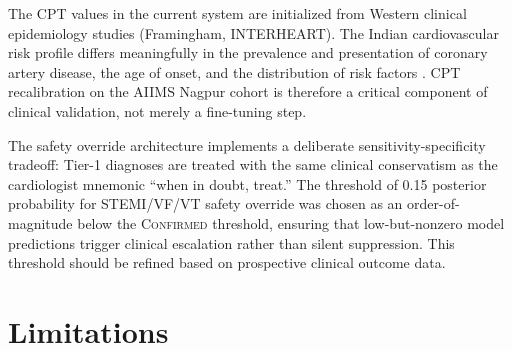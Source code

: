 \documentclass[journal]{IEEEtran}
\begin{document}
The CPT values in the current system are initialized from Western
clinical epidemiology studies (Framingham, INTERHEART).
The Indian cardiovascular risk profile differs meaningfully in
the prevalence and presentation of coronary artery disease,
the age of onset, and the distribution of risk factors
\cite{yusuf2004interheart,gupta2012india}.
CPT recalibration on the AIIMS Nagpur cohort is therefore a
critical component of clinical validation, not merely a fine-tuning
step.

The safety override architecture implements a deliberate
sensitivity-specificity tradeoff: Tier-1 diagnoses are
treated with the same clinical conservatism as the cardiologist
mnemonic ``when in doubt, treat.''
The threshold of 0.15 posterior probability for STEMI/VF/VT safety
override was chosen as an order-of-magnitude below the
\textsc{Confirmed} threshold, ensuring that low-but-nonzero
model predictions trigger clinical escalation rather than
silent suppression.
This threshold should be refined based on prospective clinical
outcome data.

\section{Limitations}
\label{sec:limitations}
\end{document}
